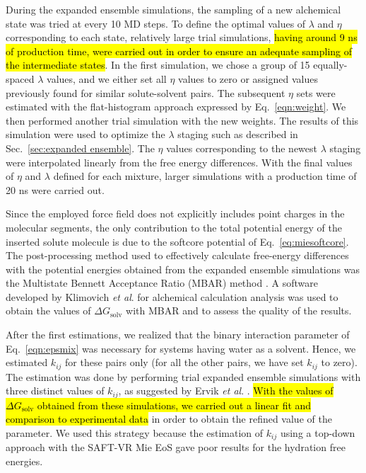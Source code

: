 \documentclass[final,12p,times,twocolumn]{elsarticle}
\begin{document}
	During the expanded ensemble simulations, the sampling of a new alchemical state was tried at every 10 MD steps. To define the optimal values of $\lambda$ and $\eta$ corresponding to each state, relatively large trial simulations, \hl{having around 9 ns of production time, were carried out in order to ensure an adequate sampling of the intermediate states}. In the first simulation, we chose a group of 15 equally-spaced $\lambda$ values, and we either set all $\eta$ values to zero or assigned values previously found for similar solute-solvent pairs. The subsequent $\eta$ sets were estimated with the flat-histogram approach expressed by Eq.~\eqref{eqn:weight}. We then performed another trial simulation with the new weights. The results of this simulation were used to optimize the $\lambda$ staging such as described in Sec.~\ref{sec:expanded ensemble}. The $\eta$ values corresponding to the newest $\lambda$ staging were interpolated linearly from the free energy differences. With the final values of $\eta$ and $\lambda$ defined for each mixture, larger simulations with a production time of 20 ns were carried out.

	Since the employed force field does not explicitly includes point charges in the molecular segments, the only contribution to the total potential energy of the inserted solute molecule is due to the softcore potential of Eq.~\eqref{eq:miesoftcore}. The post-processing method used to effectively calculate free-energy differences with the potential energies obtained from the expanded ensemble simulations was the Multistate Bennett Acceptance Ratio (MBAR) method \cite{mbar}. A software developed by Klimovich \textit{et al}. \cite{klimovich} for alchemical calculation analysis was used to obtain the values of $\Delta G_\text{solv}$ with MBAR and to assess the quality of the results.

	After the first estimations, we realized that the binary interaction parameter of Eq.~\eqref{eqn:epsmix} was necessary for systems having water as a solvent. Hence, we estimated $k_{ij}$ for these pairs only (for all the other pairs, we have set $k_{ij}$ to zero). The estimation was done by performing trial expanded ensemble simulations with three distinct values of $k_{ij}$, as suggested by Ervik \textit{et al}. \cite{ervik20162}. \hl{With the values of $\Delta G_\text{solv}$ obtained from these simulations, we carried out a linear fit and comparison to experimental data} \cite{P29900000291, doi:10.1021/ct050097l} in order to obtain the refined value of the parameter. We used this strategy because the estimation of $k_{ij}$ using a top-down approach with the SAFT-VR Mie EoS gave poor results for the hydration free energies.
\end{document}
